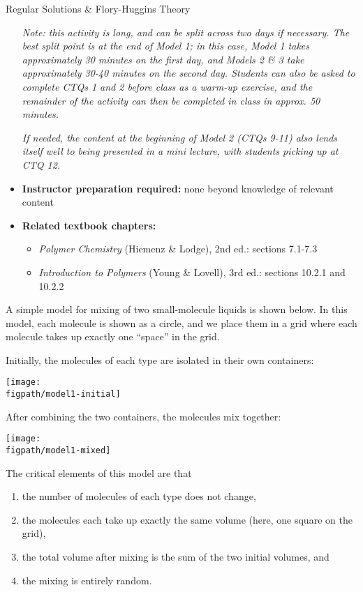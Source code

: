 \begin{activity}{Regular Solutions \& Flory-Huggins Theory}
\begin{instructornotes}
\begin{itemize}
			\emph{Note: this activity is long, and can be split across two days if necessary.  The best split point is at the end of Model 1; in this case, Model 1 takes approximately 30 minutes on the first day, and Models 2 \& 3 take approximately 30-40 minutes on the second day. Students can also be asked to complete CTQs 1 and 2 before class as a warm-up exercise, and the remainder of the activity can then be completed in class in approx. 50 minutes.}
			
			\emph{If needed, the content at the beginning of Model 2 (CTQs 9-11) also lends itself well to being presented in a mini lecture, with students picking up at CTQ 12.}
			
		\item \textbf{Instructor preparation required:} none beyond knowledge of relevant content
		\item \textbf{Related textbook chapters:}
			\begin{itemize}
				\item \emph{Polymer Chemistry} (Hiemenz \& Lodge), 2nd ed.: sections 7.1-7.3
				\item \emph{Introduction to Polymers} (Young \& Lovell), 3rd ed.: sections 10.2.1 and 10.2.2
		\end{itemize}
	\end{itemize}

\end{instructornotes}


\begin{model}
\label{\labelbase:mdl:ideal}

A simple model for mixing of two small-molecule liquids is shown below.  In this model, each molecule is shown as a circle, and we place them in a grid where each molecule takes up exactly one ``space'' in the grid.

Initially, the molecules of each type are isolated in their own containers:

\centerline{\texttt{[image: \\figpath/model1-initial]}}

After combining the two containers, the molecules mix together:

\vspace{6pt}
\centerline{\texttt{[image: \\figpath/model1-mixed]}}

The critical elements of this model are that
\begin{enumerate}[itemsep=0pt,topsep=-6pt]
	\item the number of molecules of each type does not change,
	\item the molecules each take up exactly the same volume (here, one square on the grid),
	\item the total volume after mixing is the sum of the two initial volumes, and
	\item the mixing is entirely random.
\end{enumerate}


\end{model}
\end{activity}
